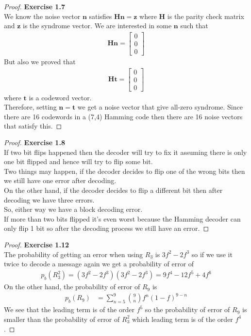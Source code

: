 \documentclass[11pt]{article}
\theoremstyle{definition}
\begin{document}
\cleardoublepage
\begin{proof}{\textbf{Exercise 1.7}}\\
We know the noise vector $\bm{n}$ satisfies $\bm{H}\bm{n} = \bm{z}$ where
$\bm{H}$ is the parity check matrix and $\bm{z}$ is the syndrome vector.
We are interested in some $\bm{n}$ such that
\begin{align*}
    \bm{H}\bm{n} = \begin{bmatrix} 0 \\ 0 \\ 0 \end{bmatrix}
\end{align*}
But also we proved that
\begin{align*}
    \bm{H}\bm{t} = \begin{bmatrix} 0 \\ 0 \\ 0 \end{bmatrix}
\end{align*}
where $\bm{t}$ is a codeword vector.\\
Therefore, setting $\bm{n} = \bm{t}$ we get a noise vector that give all-zero
syndrome. Since there are 16 codewords in a (7,4) Hamming code then there are
16 noise vectors that satisfy this.
\end{proof}

\cleardoublepage
\begin{proof}{\textbf{Exercise 1.8}}\\
If two bit flips happened then the decoder will try to fix it assuming there
is only one bit flipped and hence will try to flip some bit.\\
Two things may happen, if the decoder decides to flip one of the wrong bits 
then we still have one error after decoding.\\
On the other hand, if the decoder decides to flip a different bit then after
decoding we have three errors.\\
So, either way we have a block decoding error.\\
If more than two bits flipped it's even worst because the Hamming decoder
can only flip 1 bit so after the decoding process we still have an error.
\end{proof}

\cleardoublepage
\begin{proof}{\textbf{Exercise 1.12}}\\
The probability of getting an error when using $R_3$ is $3f^2 - 2f^3$ so if
we use it twice to decode a message again we get a probability of error of
\begin{align*}
    p_b(R_3^2) = (3f^2 - 2f^3)(3f^2 - 2f^3) =  9f^4 - 12f^5 + 4f^6
\end{align*}
On the other hand, the probability of error of $R_9$ is
\begin{align*}
    p_b(R_9) &= \sum_{n=5}^9 \binom{9}{n} f^n (1 - f)^{9- n}
\end{align*}
We see that the leading term is of the order $f^5$ so the probability of error
of $R_9$ is smaller than the probability of error of $R_3^2$ which leading term
is of the order $f^4$.
\end{proof}
\end{document}
